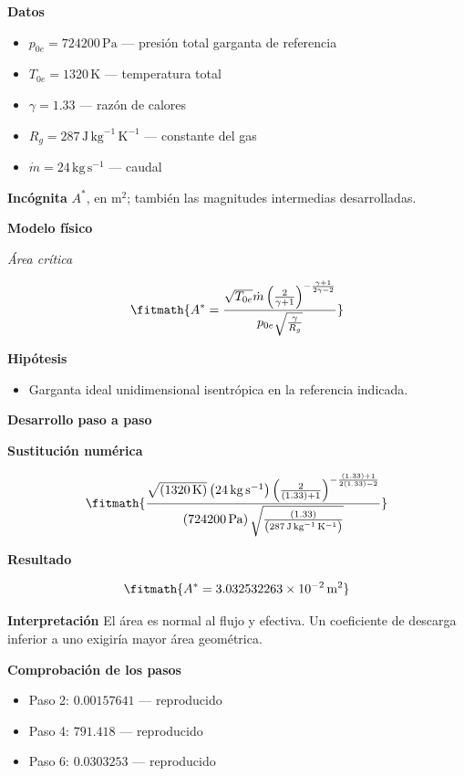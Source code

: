 \documentclass[10pt,openany]{book}
\begin{document}
\noindent\textbf{Datos}
\begin{itemize}
\item $p_{0e} = 724200\,\mathrm{Pa}$ — presión total garganta de referencia
\item $T_{0e} = 1320\,\mathrm{K}$ — temperatura total
\item $\gamma = 1.33$ — razón de calores
\item $R_g = 287\,\mathrm{J}\,\mathrm{kg}^{-1}\,\mathrm{K}^{-1}$ — constante del gas
\item $\dot m = 24\,\mathrm{kg}\,\mathrm{s}^{-1}$ — caudal
\end{itemize}

\noindent\textbf{Incógnita}
$A^{*}$, en $\mathrm{m^{2}}$; también las magnitudes intermedias desarrolladas.

\noindent\textbf{Modelo físico}

\noindent\textit{Área crítica}

\[
\fitmath{A^{*}=\frac{\sqrt{T_{0e}} \dot m \left(\frac{2}{\gamma + 1}\right)^{- \frac{\gamma + 1}{2 \gamma - 2}}}{p_{0e} \sqrt{\frac{\gamma}{R_g}}}}
\]

\noindent\textbf{Hipótesis}
\begin{itemize}
\item Garganta ideal unidimensional isentrópica en la referencia indicada.
\end{itemize}

\noindent\textbf{Desarrollo paso a paso}



\noindent\textbf{Sustitución numérica}

\[
\fitmath{\frac{\sqrt{\left(1320\,\mathrm{K}\right)} \left(24\,\mathrm{kg}\,\mathrm{s}^{-1}\right) \left(\frac{2}{\left(1.33\right) + 1}\right)^{- \frac{\left(1.33\right) + 1}{2 \left(1.33\right) - 2}}}{\left(724200\,\mathrm{Pa}\right) \sqrt{\frac{\left(1.33\right)}{\left(287\,\mathrm{J}\,\mathrm{kg}^{-1}\,\mathrm{K}^{-1}\right)}}}}
\]

\noindent\textbf{Resultado}

\[
\fitmath{A^{*}=3.032532263\times10^{-2}\,\mathrm{m}^{2}}
\]

\noindent\textbf{Interpretación}
El área es normal al flujo y efectiva. Un coeficiente de descarga inferior a uno exigiría mayor área geométrica.

\noindent\textbf{Comprobación de los pasos}
\begin{itemize}
\item Paso 2: $0.00157641$ — reproducido
\item Paso 4: $791.418$ — reproducido
\item Paso 6: $0.0303253$ — reproducido
\end{itemize}
\end{document}
